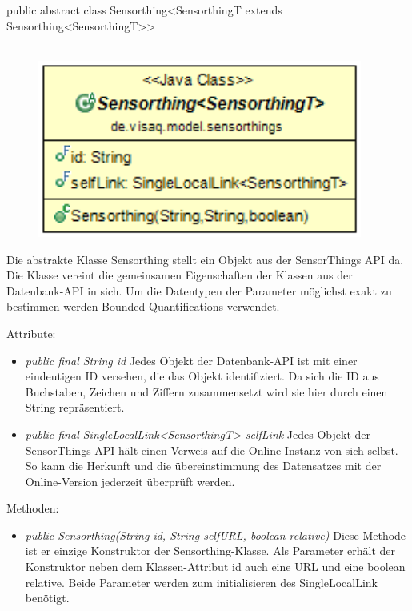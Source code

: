 public abstract class Sensorthing<SensorthingT extends Sensorthing<SensorthingT>>
\\\\
\begin{minipage}{0.4\textwidth}
    \begin{figure}[H]
        {\centering\includegraphics[width=0.95\textwidth]{media/backend/modell/classes/Sensorthing.png}}
    \end{figure}
    \end{minipage} \hfill
    \begin{minipage}{0.6\textwidth}
Die abstrakte Klasse Sensorthing stellt ein Objekt aus der \gls{SensorThings API} da.
Die Klasse vereint die gemeinsamen Eigenschaften der Klassen aus der Datenbank-\gls{API} in sich.
Um die Datentypen der Parameter möglichst exakt zu bestimmen werden \glspl{Bounded Quantification} verwendet.
\end{minipage}

Attribute:
\begin{itemize}
    \item \emph{public final String id} Jedes Objekt der Datenbank-\gls{API} ist mit einer eindeutigen ID versehen, die das Objekt identifiziert.
    Da sich die ID aus Buchstaben, Zeichen und Ziffern zusammensetzt wird sie hier durch einen String repräsentiert.
    \item \emph{public final SingleLocalLink<SensorthingT> selfLink} Jedes Objekt der \gls{SensorThings API} hält einen Verweis auf die Online-Instanz von sich selbst.
    So kann die Herkunft und die übereinstimmung des Datensatzes mit der Online-Version jederzeit überprüft werden.
\end{itemize}
Methoden: \begin{itemize}
    \item \emph{public Sensorthing(String id, String selfURL, boolean relative)} Diese Methode ist er einzige Konstruktor der Sensorthing-Klasse.
    Als Parameter erhält der Konstruktor neben dem Klassen-Attribut id auch eine URL und eine boolean relative. Beide Parameter werden zum initialisieren des SingleLocalLink benötigt.
\end{itemize}


